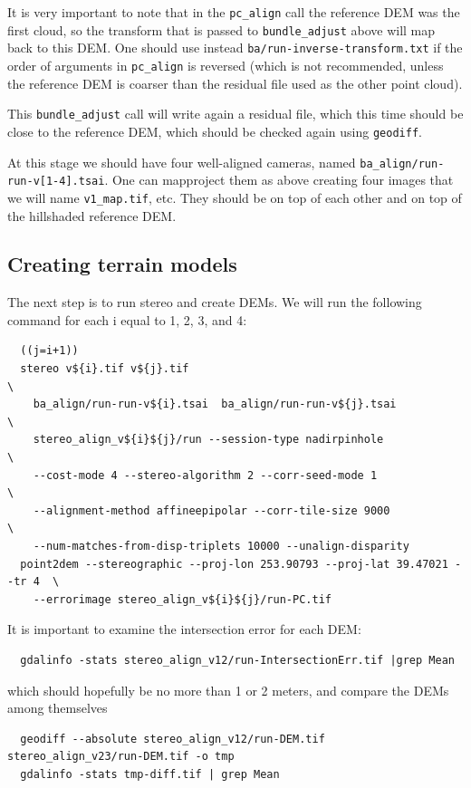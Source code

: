 It is very important to note that in the \texttt{pc\_align} call the reference
DEM was the first cloud, so the transform that is passed
to \texttt{bundle\_adjust} above will map back to this DEM. One
should use instead \texttt{ba/run-inverse-transform.txt}
if the order of arguments in \texttt{pc\_align} is reversed (which is not recommended,
unless the reference DEM is coarser than the residual file used as the other point cloud).
 
This \texttt{bundle\_adjust} call will write again a residual file,
which this time should be close to the reference DEM, which should be
checked again using \texttt{geodiff}.

At this stage we should have four well-aligned cameras, named
\texttt{ba\_align/run-run-v[1-4].tsai}. 
One can mapproject them as above creating four images
that we will name \texttt{v1\_map.tif}, etc. They should be on top of each other
and on top of the hillshaded reference DEM.

\subsection{Creating terrain models}

The next step is to run stereo and create DEMs. We will run the following command
for each i equal to 1, 2, 3, and 4: 
\begin{verbatim}
  ((j=i+1))
  stereo v${i}.tif v${j}.tif                                                 \
    ba_align/run-run-v${i}.tsai  ba_align/run-run-v${j}.tsai                 \
    stereo_align_v${i}${j}/run --session-type nadirpinhole                   \
    --cost-mode 4 --stereo-algorithm 2 --corr-seed-mode 1                    \
    --alignment-method affineepipolar --corr-tile-size 9000                  \
    --num-matches-from-disp-triplets 10000 --unalign-disparity
  point2dem --stereographic --proj-lon 253.90793 --proj-lat 39.47021 --tr 4  \
    --errorimage stereo_align_v${i}${j}/run-PC.tif
\end{verbatim}

It is important to examine the intersection error for each DEM:
\begin{verbatim}
  gdalinfo -stats stereo_align_v12/run-IntersectionErr.tif |grep Mean
\end{verbatim}

which should hopefully be no more than 1 or 2 meters, and compare the DEMs among themselves
\begin{verbatim}
  geodiff --absolute stereo_align_v12/run-DEM.tif stereo_align_v23/run-DEM.tif -o tmp 
  gdalinfo -stats tmp-diff.tif | grep Mean
\end{verbatim}

